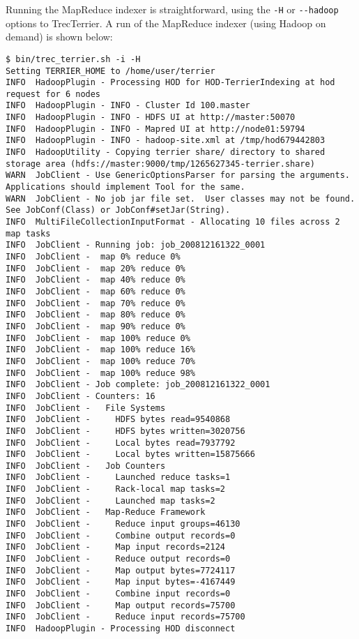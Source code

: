 Running the MapReduce indexer is straightforward, using the \texttt{-H}
or \texttt{-\/-hadoop} options to TrecTerrier. A run of the MapReduce
indexer (using Hadoop on demand) is shown below:

\begin{verbatim}
$ bin/trec_terrier.sh -i -H
Setting TERRIER_HOME to /home/user/terrier
INFO  HadoopPlugin - Processing HOD for HOD-TerrierIndexing at hod request for 6 nodes
INFO  HadoopPlugin - INFO - Cluster Id 100.master
INFO  HadoopPlugin - INFO - HDFS UI at http://master:50070
INFO  HadoopPlugin - INFO - Mapred UI at http://node01:59794
INFO  HadoopPlugin - INFO - hadoop-site.xml at /tmp/hod679442803
INFO  HadoopUtility - Copying terrier share/ directory to shared storage area (hdfs://master:9000/tmp/1265627345-terrier.share)
WARN  JobClient - Use GenericOptionsParser for parsing the arguments. Applications should implement Tool for the same.
WARN  JobClient - No job jar file set.  User classes may not be found. See JobConf(Class) or JobConf#setJar(String).
INFO  MultiFileCollectionInputFormat - Allocating 10 files across 2 map tasks
INFO  JobClient - Running job: job_200812161322_0001
INFO  JobClient -  map 0% reduce 0%
INFO  JobClient -  map 20% reduce 0%
INFO  JobClient -  map 40% reduce 0%
INFO  JobClient -  map 60% reduce 0%
INFO  JobClient -  map 70% reduce 0%
INFO  JobClient -  map 80% reduce 0%
INFO  JobClient -  map 90% reduce 0%
INFO  JobClient -  map 100% reduce 0%
INFO  JobClient -  map 100% reduce 16%
INFO  JobClient -  map 100% reduce 70%
INFO  JobClient -  map 100% reduce 98%
INFO  JobClient - Job complete: job_200812161322_0001
INFO  JobClient - Counters: 16
INFO  JobClient -   File Systems
INFO  JobClient -     HDFS bytes read=9540868
INFO  JobClient -     HDFS bytes written=3020756
INFO  JobClient -     Local bytes read=7937792
INFO  JobClient -     Local bytes written=15875666
INFO  JobClient -   Job Counters 
INFO  JobClient -     Launched reduce tasks=1
INFO  JobClient -     Rack-local map tasks=2
INFO  JobClient -     Launched map tasks=2
INFO  JobClient -   Map-Reduce Framework
INFO  JobClient -     Reduce input groups=46130
INFO  JobClient -     Combine output records=0
INFO  JobClient -     Map input records=2124
INFO  JobClient -     Reduce output records=0
INFO  JobClient -     Map output bytes=7724117
INFO  JobClient -     Map input bytes=-4167449
INFO  JobClient -     Combine input records=0
INFO  JobClient -     Map output records=75700
INFO  JobClient -     Reduce input records=75700
INFO  HadoopPlugin - Processing HOD disconnect
\end{verbatim}

